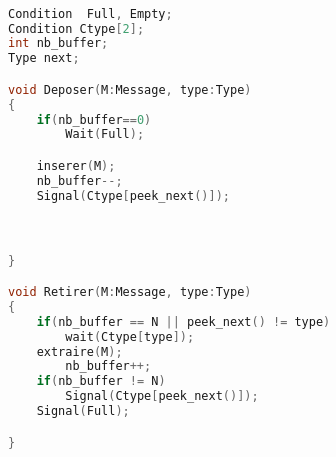\documentclass[10pt,a4paper]{article}
\begin{document}
\begin{lstlisting}[language=C, caption=Corps moniteur Prod\_Cons]

Condition  Full, Empty;
Condition Ctype[2];
int nb_buffer;
Type next;

void Deposer(M:Message, type:Type)
{
	if(nb_buffer==0)
		Wait(Full);

	inserer(M);
	nb_buffer--;
	Signal(Ctype[peek_next()]);



}

void Retirer(M:Message, type:Type)
{
	if(nb_buffer == N || peek_next() != type)
		wait(Ctype[type]);
	extraire(M);
		nb_buffer++;
	if(nb_buffer != N)
		Signal(Ctype[peek_next()]);
	Signal(Full);

}

\end{lstlisting}
\end{document}
